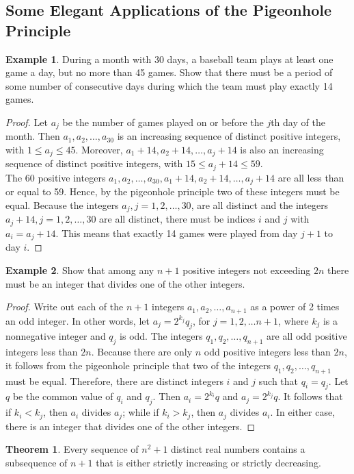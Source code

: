 \documentclass[article, 12pt]{article}
\theoremstyle{definition}
\newtheorem{example}{Example}[subsection]
\newtheorem{theorem}{Theorem}[subsection]
\begin{document}
    \subsection{Some Elegant Applications of the Pigeonhole Principle}
    \begin{example}
        During a month with 30 days, a baseball team plays at least one game a day, but no more than 45 games. Show that there must be a period of some number of consecutive days during which the team must play exactly 14 games.
        \begin{proof}
            Let $a_j$ be the number of games played on or before the $j$th day of the month. Then $a_1, a_2, \dots, a_{30}$ is an increasing sequence of distinct positive integers, with $1 \leq a_j \leq 45$. Moreover, $a_1 + 14, a_2 + 14, \dots, a_j + 14$ is also an increasing sequence of distinct positive integers, with $15 \leq a_j + 14 \leq 59$. \\

            The 60 positive integers $a_1, a_2, \dots, a_{30}, a_1 + 14, a_2 + 14, \dots, a_j + 14$ are all less than or equal to 59. Hence, by the pigeonhole principle two of these integers must be equal. Because the integers $a_j, j = 1,2,\dots, 30$, are all distinct and the integers $a_j+14, j= 1,2,\dots,30$ are all distinct, there must be indices $i$ and $j$ with $a_i = a_j + 14$. This means that exactly 14 games were played from day $j+1$ to day $i$.
        \end{proof}
    \end{example}
    \begin{example}
        Show that among any $n+1$ positive integers not exceeding $2n$ there must be an integer that divides one of the other integers.
        \begin{proof}
            Write out each of the $n+1$ integers $a_1, a_2, \dots, a_{n+1}$ as a power of 2 times an odd integer. In other words, let $a_j=2^{k_j}q_j$, for $j=1,2,\dots n+1$, where $k_j$ is a nonnegative integer and $q_j$ is odd. The integers $q_1, q_2, \dots, q_{n+1}$ are all odd positive integers less than $2n$. Because there are only $n$ odd positive integers less than $2n$, it follows from the pigeonhole principle that two of the integers $q_1, q_2, \dots, q_{n+1}$ must be equal. Therefore, there are distinct integers $i$ and $j$ such that $q_i = q_j$. Let $q$ be the common value of $q_i$ and $q_j$. Then $a_i = 2^{k_i}q$ and $a_j = 2^{k_j}q$. It follows that if $k_i < k_j$, then $a_i$ divides $a_j$; while if $k_i > k_j$, then $a_j$ divides $a_i$. In either case, there is an integer that divides one of the other integers.
        \end{proof}
    \end{example}
    \begin{theorem}
        Every sequence of $n^2 + 1$ distinct real numbers contains a subsequence of $n+1$ that is either strictly increasing or strictly decreasing.
    \end{theorem}    
\end{document}
